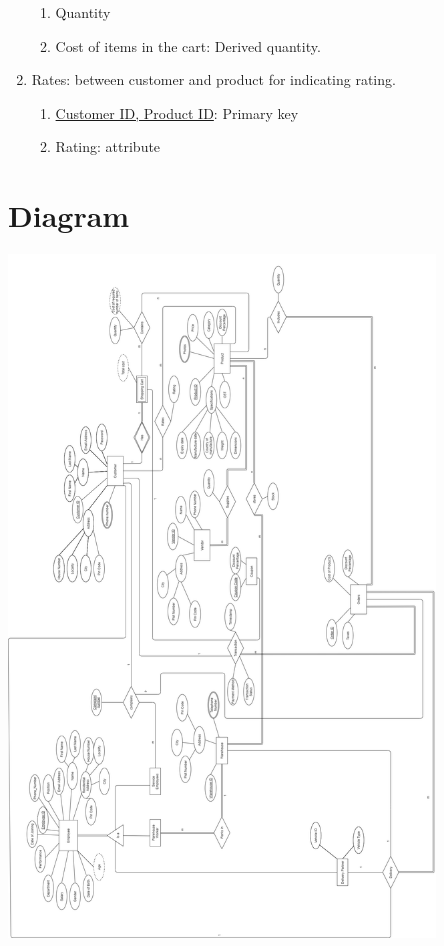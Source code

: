 \documentclass[12pt]{report}
\begin{document}
\begin{enumerate}
		\begin{enumerate}
			\item Quantity
			\item Cost of items in the cart: Derived quantity.
		\end{enumerate}
	\item Rates: between customer and product for indicating rating.
		\begin{enumerate}
			\item \underline{Customer ID, Product ID}: Primary key
			\item Rating: attribute
		\end{enumerate}
	\end{enumerate}


	\section{Diagram}
	\includegraphics[width =0.85\textwidth]{Pictures/ER_Diagram.png}
\end{document}
